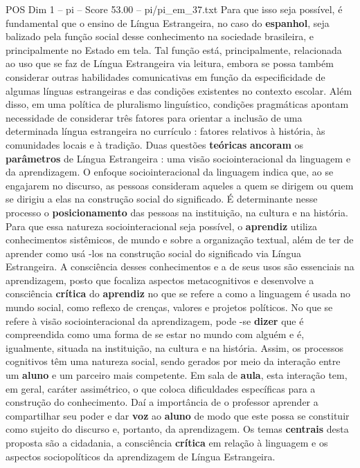 \begin{textsample}{POS Dim 1 – pi – Score 53.00 – pi/pi\_em\_37.txt}
Para que isso seja possível, é fundamental que o ensino de Língua Estrangeira, no caso do \textbf{espanhol}, seja balizado pela função social desse conhecimento na sociedade brasileira, e principalmente no Estado em tela.
Tal função está, principalmente, relacionada ao uso que se faz de Língua Estrangeira via leitura, embora se possa também considerar outras habilidades comunicativas em função da especificidade de algumas línguas estrangeiras e das condições existentes no contexto escolar.
Além disso, em uma política de pluralismo linguístico, condições pragmáticas apontam necessidade de considerar três fatores para orientar a inclusão de uma determinada língua estrangeira no currículo : fatores relativos à história, às comunidades locais e à tradição.
Duas questões \textbf{teóricas} \textbf{ancoram} os \textbf{parâmetros} de Língua Estrangeira : uma visão sociointeracional da linguagem e da aprendizagem.
O enfoque sociointeracional da linguagem indica que, ao se engajarem no discurso, as pessoas consideram aqueles a quem se dirigem ou quem se dirigiu a elas na construção social do significado.
É determinante nesse processo o \textbf{posicionamento} das pessoas na instituição, na cultura e na história.
Para que essa natureza sociointeracional seja possível, o \textbf{aprendiz} utiliza conhecimentos sistêmicos, de mundo e sobre a organização textual, além de ter de aprender como usá -los na construção social do significado via Língua Estrangeira.
A consciência desses conhecimentos e a de seus usos são essenciais na aprendizagem, posto que focaliza aspectos metacognitivos e desenvolve a consciência \textbf{crítica} do \textbf{aprendiz} no que se refere a como a linguagem é usada no mundo social, como reflexo de crenças, valores e projetos políticos.
No que se refere à visão sociointeracional da aprendizagem, pode -se \textbf{dizer} que é compreendida como uma forma de se estar no mundo com alguém e é, igualmente, situada na instituição, na cultura e na história.
Assim, os processos cognitivos têm uma natureza social, sendo gerados por meio da interação entre um \textbf{aluno} e um parceiro mais competente.
Em sala de \textbf{aula}, esta interação tem, em geral, caráter assimétrico, o que coloca dificuldades específicas para a construção do conhecimento.
Daí a importância de o professor aprender a compartilhar seu poder e dar \textbf{voz} ao \textbf{aluno} de modo que este possa se constituir como sujeito do discurso e, portanto, da aprendizagem.
Os temas \textbf{centrais} desta proposta são a cidadania, a consciência \textbf{crítica} em relação à linguagem e os aspectos sociopolíticos da aprendizagem de Língua Estrangeira.

\end{textsample}
